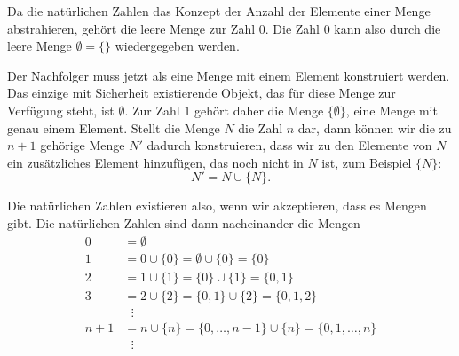 Da die natürlichen Zahlen das Konzept der Anzahl der Elemente einer
Menge abstrahieren, gehört die leere Menge zur Zahl $0$.
Die Zahl $0$ kann also durch die leere Menge $\emptyset = \{\}$
wiedergegeben werden.

Der Nachfolger muss jetzt als eine Menge mit einem Element konstruiert
werden.
Das einzige mit Sicherheit existierende Objekt, das für diese Menge
zur Verfügung steht, ist $\emptyset$.
Zur Zahl $1$ gehört daher die Menge $\{\emptyset\}$, eine Menge mit
genau einem Element.
Stellt die Menge $N$ die Zahl $n$ dar, dann können wir die zu $n+1$
gehörige Menge $N'$ dadurch konstruieren, dass wir zu den Elemente
von $N$ ein zusätzliches Element hinzufügen, das noch nicht in $N$ ist,
zum Beispiel $\{N\}$:
\[
N' = N \cup \{ N \}.
\]

Die natürlichen Zahlen existieren also, wenn wir akzeptieren, dass es
Mengen gibt.
Die natürlichen Zahlen sind dann nacheinander die Mengen
\begin{align*}
0 &= \emptyset 
\\
1 &= 0 \cup \{0\} = \emptyset \cup \{0\} = \{0\}
\\
2 &= 1 \cup \{1\} = \{0\}\cup\{1\} = \{0,1\}
\\
3 &= 2 \cup \{2\} = \{0,1\}\cup \{2\} = \{0,1,2\}
\\
&\phantom{n}\vdots
\\
n+1&= n \cup \{n\} = \{0,\dots,n-1\} \cup \{n\} = \{0,1,\dots,n\}
\\
&\phantom{n}\vdots
\end{align*}





